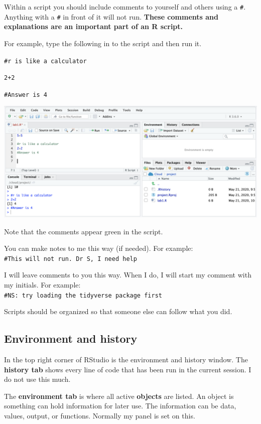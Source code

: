 \documentclass[
]{book}
\begin{document}
Within a script you should include comments to yourself and others using a \texttt{\#}. Anything with a \texttt{\#} in front of it will not run. \textbf{These comments and explanations are an important part of an R script.}

For example, type the following in to the script and then run it.

\texttt{\#r\ is\ like\ a\ calculator}

\texttt{2+2}

\texttt{\#Answer\ is\ 4}

\includegraphics{img/comment.png}

Note that the comments appear green in the script.

You can make notes to me this way (if needed). For example:\\
\texttt{\#This\ will\ not\ run.\ Dr\ S,\ I\ need\ help}

I will leave comments to you this way. When I do, I will start my comment with my initials. For example:\\
\texttt{\#NS:\ try\ loading\ the\ tidyverse\ package\ first}

Scripts should be organized so that someone else can follow what you did.

\hypertarget{environment-and-history}{%
\subsection{Environment and history}\label{environment-and-history}}

In the top right corner of RStudio is the environment and history window. The \textbf{history tab} shows every line of code that has been run in the current session. I do not use this much.

The \textbf{environment tab} is where all active \textbf{objects} are listed. An object is something can hold information for later use. The information can be data, values, output, or functions. Normally my panel is set on this.
\end{document}

